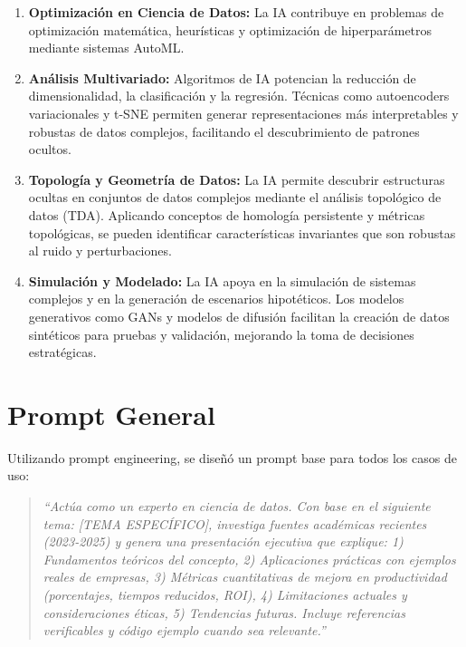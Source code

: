\documentclass[11pt]{article}
\begin{document}
\begin{enumerate}
	\item \textbf{Optimizaci\'on en Ciencia de Datos:} La IA contribuye en problemas de optimizaci\'on matem\'atica, heur\'isticas y optimizaci\'on de hiperpar\'ametros mediante sistemas AutoML.

	\item \textbf{An\'alisis Multivariado:} Algoritmos de IA potencian la reducci\'on de dimensionalidad, la clasificaci\'on y la regresi\'on. T\'ecnicas como autoencoders variacionales y t-SNE permiten generar representaciones m\'as interpretables y robustas de datos complejos, facilitando el descubrimiento de patrones ocultos.

	\item \textbf{Topolog\'ia y Geometr\'ia de Datos:} La IA permite descubrir estructuras ocultas en conjuntos de datos complejos mediante el an\'alisis topol\'ogico de datos (TDA). Aplicando conceptos de homolog\'ia persistente y m\'etricas topol\'ogicas, se pueden identificar caracter\'isticas invariantes que son robustas al ruido y perturbaciones.

	\item \textbf{Simulaci\'on y Modelado:} La IA apoya en la simulaci\'on de sistemas complejos y en la generaci\'on de escenarios hipot\'eticos. Los modelos generativos como GANs y modelos de difusi\'on facilitan la creaci\'on de datos sint\'eticos para pruebas y validaci\'on, mejorando la toma de decisiones estrat\'egicas.
\end{enumerate}

\section*{Prompt General}
Utilizando prompt engineering, se dise\~n\'o un prompt base para todos los casos de uso:

\begin{quote}
	\textit{``Act\'ua como un experto en ciencia de datos. Con base en el siguiente tema: [TEMA ESPEC\'IFICO], investiga fuentes acad\'emicas recientes (2023-2025) y genera una presentaci\'on ejecutiva que explique: 1) Fundamentos te\'oricos del concepto, 2) Aplicaciones pr\'acticas con ejemplos reales de empresas, 3) M\'etricas cuantitativas de mejora en productividad (porcentajes, tiempos reducidos, ROI), 4) Limitaciones actuales y consideraciones \'eticas, 5) Tendencias futuras. Incluye referencias verificables y c\'odigo ejemplo cuando sea relevante.''}
\end{quote}
\end{document}
